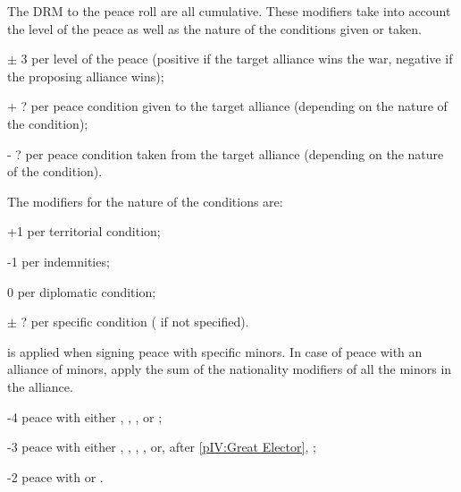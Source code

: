 \label{chPeace:peace minors modifiers}
The DRM to the peace roll are all cumulative.
 These modifiers take into account the level of
the peace as well as the nature of the conditions given or taken.
\begin{modlist}
\item[$\pm$ 3] per level of the peace (positive if the target alliance wins
  the war, negative if the proposing alliance wins);
\item[+ ?] per peace condition given to the target alliance (depending on the
  nature of the condition);
\item[- ?] per peace condition taken from the target alliance (depending on
  the nature of the condition).
\end{modlist}
\bparag The modifiers for the nature of the conditions are:
\begin{modlist}
\item[+1] per territorial condition;
\item[-1] per indemnities;
\item[0] per diplomatic condition;
\item[$\pm$ ?] per specific condition ( if not specified).
\end{modlist}
 is applied when signing peace with specific
minors. In case of peace with an alliance of minors, apply the sum of the
nationality modifiers of all the minors in the alliance.
\begin{modlist}
\item[-4] peace with either \paysPerse, \paysEgypte, \paysDamas, \paysChine or
  \paysJapon;
\item[-3] peace with either \paysUSA, \paysMogol, \paysVenise, \paysPologne,
  \paysHabsbourg or, after \ref{pIV:Great Elector}, \paysBrandebourg;
\item[-2] peace with \paysPortugal or \paysDanemark.
\end{modlist}
~
